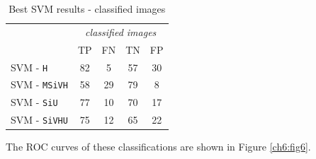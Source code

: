 \vspace{0.5cm}


\begin{table}[!hbt]
\small
 \centering
 \begin{tabular}{lcccc}
  \toprule
  & \multicolumn{4}{c}{\textit{classified images}} \\
  \cmidrule(lr){2-5}
   & TP  & FN & TN & FP  \\
   \midrule
   SVM - \texttt{H}      & \cellcolor{YellowGreen} 82 & 5 & 57 & 30  \\
   SVM - \texttt{MSiVH}     & 58 & 29 & \cellcolor{YellowGreen} 79 & 8  \\
   SVM - \texttt{SiU}     & 77 & 10 & 70 & 17  \\
   SVM - \texttt{SiVHU}     & 75 & 12 & 65 & 22 \\
    \bottomrule
    \end{tabular}
 \caption{Best SVM results - classified images}
 \label{ch6:tab10}
\end{table}  


\noindent The \Gls{ROC} curves of these classifications are shown in Figure \ref{ch6:fig6}.

\clearpage


